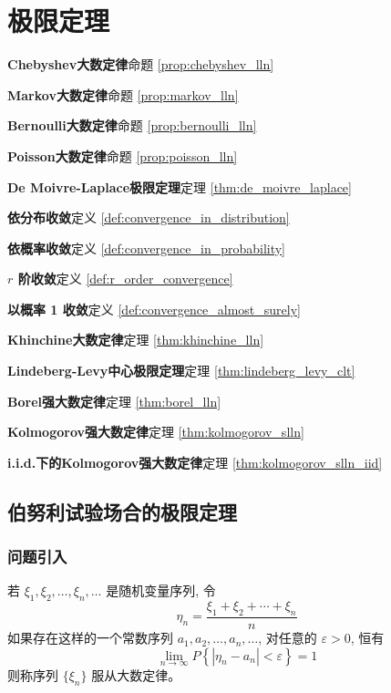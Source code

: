 \chapter{极限定理}\label{chap:极限定理}
\begin{introduction}
\item \textbf{Chebyshev大数定律}\quad 命题 \ref{prop:chebyshev_lln}
\item \textbf{Markov大数定律}\quad 命题 \ref{prop:markov_lln}
\item \textbf{Bernoulli大数定律}\quad 命题 \ref{prop:bernoulli_lln}
\item \textbf{Poisson大数定律}\quad 命题 \ref{prop:poisson_lln}
\item \textbf{De Moivre-Laplace极限定理}\quad 定理 \ref{thm:de_moivre_laplace}
\item \textbf{依分布收敛}\quad 定义 \ref{def:convergence_in_distribution}
\item \textbf{依概率收敛}\quad 定义 \ref{def:convergence_in_probability}
\item \textbf{$r$ 阶收敛}\quad 定义 \ref{def:r_order_convergence}
\item \textbf{以概率 1 收敛}\quad 定义 \ref{def:convergence_almost_surely}
\item \textbf{Khinchine大数定律}\quad 定理 \ref{thm:khinchine_lln}
\item \textbf{Lindeberg-Levy中心极限定理}\quad 定理 \ref{thm:lindeberg_levy_clt}
\item \textbf{Borel强大数定律}\quad 定理 \ref{thm:borel_lln}
\item \textbf{Kolmogorov强大数定律}\quad 定理 \ref{thm:kolmogorov_slln}
\item \textbf{i.i.d.下的Kolmogorov强大数定律}\quad 定理 \ref{thm:kolmogorov_slln_iid}
\end{introduction}
\section{伯努利试验场合的极限定理}\label{sec:伯努利试验场合的极限定理}
\subsection{问题引入}\label{subsec:问题引入}
\begin{definition}[大数定律]\label{def:law_of_large_numbers}
    若 $\xi_1, \xi_2, \ldots, \xi_n, \ldots$ 是随机变量序列, 令
\begin{equation} \label{eq:eta_n}
\eta_n = \frac{\xi_1 + \xi_2 + \cdots + \xi_n}{n}
\end{equation}
如果存在这样的一个常数序列 $a_1, a_2, \ldots, a_n, \ldots$, 对任意的 $\varepsilon > 0$, 恒有
\begin{equation} \label{eq:law_of_large_numbers}
\lim_{n \to \infty} P \left\{ |\eta_n - a_n| < \varepsilon \right\} = 1
\end{equation}
则称序列 $\{ \xi_n \}$ 服从大数定律。
\end{definition}

